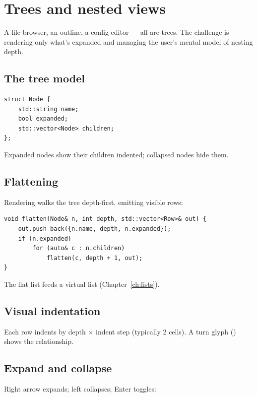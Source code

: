 \chapter{Trees and nested views}
\label{ch:trees}

\begin{aside}
A file browser, an outline, a config editor --- all are trees.
The challenge is rendering only what's expanded and managing
the user's mental model of nesting depth.
\end{aside}

\section{The tree model}

\begin{lstlisting}
struct Node {
    std::string name;
    bool expanded;
    std::vector<Node> children;
};
\end{lstlisting}

Expanded nodes show their children indented; collapsed
nodes hide them.

\section{Flattening}

Rendering walks the tree depth-first, emitting visible rows:

\begin{lstlisting}
void flatten(Node& n, int depth, std::vector<Row>& out) {
    out.push_back({n.name, depth, n.expanded});
    if (n.expanded)
        for (auto& c : n.children)
            flatten(c, depth + 1, out);
}
\end{lstlisting}

The flat list feeds a virtual list (Chapter~\ref{ch:lists}).

\section{Visual indentation}

Each row indents by depth $\times$ indent step (typically 2
cells). A turn glyph (\code{|--}) shows the relationship.

\section{Expand and collapse}

Right arrow expands; left collapses; Enter toggles:

